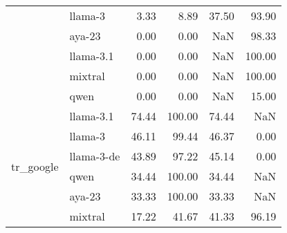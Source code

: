 \begin{tabular}{llrrrr}
 & llama-3 & 3.33 & 8.89 & 37.50 & 93.90 \\
 & aya-23 & 0.00 & 0.00 & NaN & 98.33 \\
 & llama-3.1 & 0.00 & 0.00 & NaN & 100.00 \\
 & mixtral & 0.00 & 0.00 & NaN & 100.00 \\
 & qwen & 0.00 & 0.00 & NaN & 15.00 \\
\cline{1-6}
\multirow[t]{6}{*}{tr_google} & llama-3.1 & 74.44 & 100.00 & 74.44 & NaN \\
 & llama-3 & 46.11 & 99.44 & 46.37 & 0.00 \\
 & llama-3-de & 43.89 & 97.22 & 45.14 & 0.00 \\
 & qwen & 34.44 & 100.00 & 34.44 & NaN \\
 & aya-23 & 33.33 & 100.00 & 33.33 & NaN \\
 & mixtral & 17.22 & 41.67 & 41.33 & 96.19 \\
\cline{1-6}
\bottomrule
\end{tabular}
